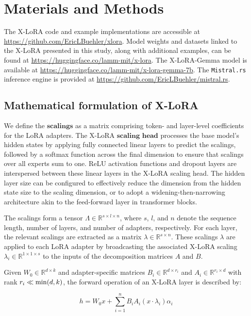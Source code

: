 \section{Materials and Methods}

The X-LoRA code and example implementations are accessible at \url{https://github.com/EricLBuehler/xlora}. Model weights and datasets linked to the X-LoRA presented in this study, along with additional examples, can be found at \url{https://huggingface.co/lamm-mit/x-lora}. The X-LoRA-Gemma model is available at \url{https://huggingface.co/lamm-mit/x-lora-gemma-7b}. The \texttt{Mistral.rs} inference engine is provided at \url{https://github.com/EricLBuehler/mistral.rs}.

\subsection{Mathematical formulation of X-LoRA} We define the $\mathbf{scalings}$ as a matrix comprising token- and layer-level coefficients for the LoRA adapters. The X-LoRA $\mathbf{scaling}$ $\mathbf{head}$ processes the base model's hidden states by applying fully connected linear layers to predict the scalings, followed by a softmax function across the final dimension to ensure that scalings over all experts sum to one. ReLU activation functions and dropout layers are interspersed between these linear layers in the X-LoRA scaling head. The hidden layer size can be configured to effectively reduce the dimension from the hidden state size to the scaling dimension, or to adopt a widening-then-narrowing architecture akin to the feed-forward layer in transformer blocks.

The scalings form a tensor $\Lambda \in \mathbb{R}^{s \times l \times n}$, where $s$, $l$, and $n$ denote the sequence length, number of layers, and number of adapters, respectively. For each layer, the relevant scalings are extracted as a matrix $\lambda \in \mathbb{R}^{s \times n}$. These scalings $\lambda$ are applied to each LoRA adapter by broadcasting the associated X-LoRA scaling $\lambda_i \in \mathbb{R}^{1 \times 1 \times s}$ to the inputs of the decomposition matrices $A$ and $B$.

Given $W_0 \in \mathbb{R}^{d \times k}$ and adapter-specific matrices $B_i \in \mathbb{R}^{d \times r_i}$ and $A_i \in \mathbb{R}^{r_i \times d}$ with rank $r_i \ll {\rm min}(d,k)$, the forward operation of an X-LoRA layer is described by:

\begin{equation}
    h = W_0 x + \sum_{i=1}^{n} B_i A_i (x \cdot \lambda_i) \alpha_i
\end{equation}

